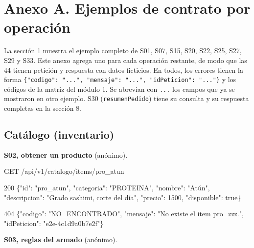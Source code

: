 
\section{Anexo A. Ejemplos de contrato por operación}

La sección 1 muestra el ejemplo completo de S01, S07, S15, S20, S22, S25, S27, S29 y S33. Este anexo agrega uno para cada operación restante, de modo que las 44 tienen petición y respuesta con datos ficticios. En todos, los errores tienen la forma \texttt{\{"codigo":\allowbreak{} ".\allowbreak{}.\allowbreak{}.\allowbreak{}",\allowbreak{} "mensaje":\allowbreak{} ".\allowbreak{}.\allowbreak{}.\allowbreak{}",\allowbreak{} "idPeticion":\allowbreak{} ".\allowbreak{}.\allowbreak{}.\allowbreak{}"\}} y los códigos de la matriz del módulo 1. Se abrevian con \texttt{.\allowbreak{}.\allowbreak{}.\allowbreak{}} los campos que ya se mostraron en otro ejemplo. S30 (\texttt{resumenPedido}) tiene su consulta y su respuesta completas en la sección 8.


\subsection{Catálogo (inventario)}

\textbf{S02, obtener un producto} (anónimo).


\begin{codigo}
GET /\allowbreak{}api/\allowbreak{}v1/\allowbreak{}catalogo/\allowbreak{}items/\allowbreak{}pro\_\allowbreak{}atun\par
\end{codigo}

\begin{codigo}
200 \{"id":\allowbreak{} "pro\_\allowbreak{}atun",\allowbreak{} "categoria":\allowbreak{} "PROTEINA",\allowbreak{} "nombre":\allowbreak{} "Atún",\allowbreak{} "descripcion":\allowbreak{} "Grado sashimi,\allowbreak{} corte del día",\allowbreak{} "precio":\allowbreak{} 1500,\allowbreak{} "disponible":\allowbreak{} true\}\par
404 \{"codigo":\allowbreak{} "NO\_\allowbreak{}ENCONTRADO",\allowbreak{} "mensaje":\allowbreak{} "No existe el item pro\_\allowbreak{}zzz.\allowbreak{}",\allowbreak{} "idPeticion":\allowbreak{} "e2e-\allowbreak{}4c1d9a0b7e2f"\}\par
\end{codigo}

\textbf{S03, reglas del armado} (anónimo).



